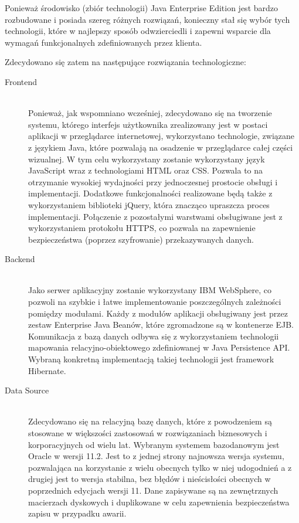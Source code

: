 Ponieważ środowisko (zbiór technologii) Java Enterprise Edition jest bardzo
rozbudowane i posiada szereg różnych rozwiązań, konieczny stał się wybór tych
technologii, które w najlepszy sposób odwzierciedli i zapewni wsparcie dla
wymagań funkcjonalnych zdefiniowanych przez klienta. 

Zdecydowano się zatem na następujące rozwiązania technologiczne:

\begin{description}
\item[Frontend] \hfill \\
Ponieważ, jak wspomniano wcześniej, zdecydowano się na tworzenie systemu,
którego interfejs użytkownika zrealizowany jest w postaci aplikacji w
przeglądarce internetowej, wykorzystano technologie, związane z językiem Java,
które pozwalają na osadzenie w przeglądarce całej części wizualnej. W tym celu
wykorzystany zostanie wykorzystany język JavaScript wraz z technologiami HTML
oraz CSS. Pozwala to na otrzymanie wysokiej wydajności przy jednoczesnej
prostocie obsługi i implementacji. Dodatkowe funkcjonalności realizowane będą
także z wykorzystaniem biblioteki jQuery, która znacząco upraszcza proces
implementacji. Połączenie z pozostałymi warstwami obsługiwane jest z
wykorzystaniem protokołu HTTPS, co pozwala na zapewnienie bezpieczeństwa
(poprzez szyfrowanie) przekazywanych danych.
\item[Backend] \hfill \\
Jako serwer aplikacyjny zostanie wykorzystany IBM WebSphere, co pozwoli na
szybkie i łatwe implementowanie poszczególnych zależności pomiędzy modułami.
Każdy z modułów aplikacji obsługiwany jest przez zestaw Enterprise Java Beanów,
które zgromadzone są w kontenerze EJB. Komunikacja z bazą danych odbywa się z
wykorzystaniem technologii mapowania relacyjno-obiektowego zdefiniowanej w Java
Persistence API. Wybraną konkretną implementacją takiej technologii jest
framework Hibernate.
\item[Data Source] \hfill \\
Zdecydowano się na relacyjną bazę danych, które z powodzeniem są stosowane w
większości zastosowań w rozwiązaniach biznesowych i korporacyjnych od wielu lat.
Wybranym systemem bazodanowym jest Oracle w wersji 11.2. Jest to z jednej strony
najnowsza wersja systemu, pozwalająca na korzystanie z wielu obecnych tylko w
niej udogodnień a z drugiej jest to wersja stabilna, bez błędów i nieścisłości
obecnych w poprzednich edycjach wersji 11. Dane zapisywane są na zewnętrznych
macierzach dyskowych i duplikowane w celu zapewnienia bezpieczeństwa zapisu w
przypadku awarii.
\end{description}


